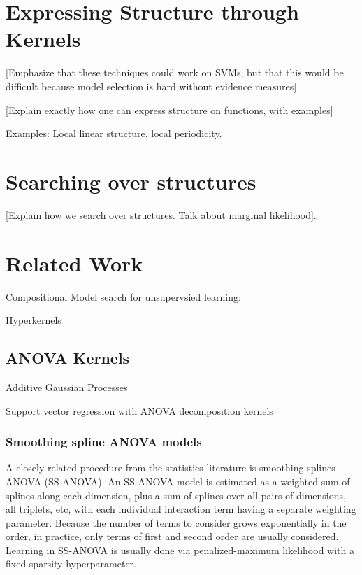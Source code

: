 \documentclass[twoside]{article}
\begin{document}
\section{Expressing Structure through Kernels}

[Emphasize that these techniques could work on SVMs, but that this would be difficult because model selection is hard without evidence measures]

[Explain exactly how one can express structure on functions, with examples]

Examples: Local linear structure, local periodicity.

\section{Searching over structures}

[Explain how we search over structures.  Talk about marginal likelihood].

\section{Related Work}

Compositional Model search for unsupervsied learning: \cite{grosse2012exploiting}

Hyperkernels \cite{ong2002hyperkernels}

\subsection{ANOVA Kernels}

Additive Gaussian Processes \cite{duvenaud2011additive11}

Support vector regression with ANOVA decomposition kernels \cite{stitson1999support}

\subsubsection{Smoothing spline ANOVA models}

A closely related procedure from the statistics literature is smoothing-splines ANOVA (SS-ANOVA)\cite{wahba1990spline, gu2002smoothing}. An SS-ANOVA model is estimated as a weighted sum of splines along each dimension, plus a sum of splines over all pairs of dimensions, all triplets, etc, with each individual interaction term having a separate weighting parameter.  Because the number of terms to consider grows exponentially in the order, in practice, only terms of first and second order are usually considered.  Learning in SS-ANOVA is usually done via penalized-maximum likelihood with a fixed sparsity hyperparameter.
\end{document}
